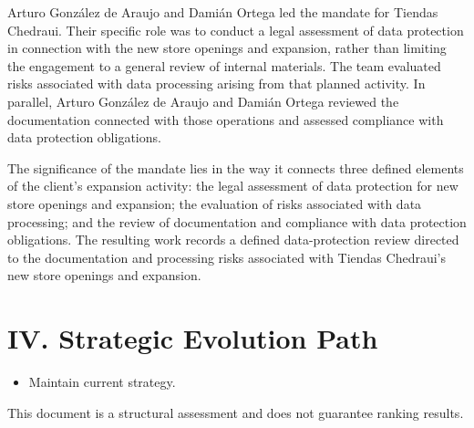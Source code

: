 \documentclass[11pt]{article}
\begin{document}
\begin{itemize}
Arturo González de Araujo and Damián Ortega led the mandate for Tiendas Chedraui. Their specific role was to conduct a legal assessment of data protection in connection with the new store openings and expansion, rather than limiting the engagement to a general review of internal materials. The team evaluated risks associated with data processing arising from that planned activity. In parallel, Arturo González de Araujo and Damián Ortega reviewed the documentation connected with those operations and assessed compliance with data protection obligations.

The significance of the mandate lies in the way it connects three defined elements of the client’s expansion activity: the legal assessment of data protection for new store openings and expansion; the evaluation of risks associated with data processing; and the review of documentation and compliance with data protection obligations. The resulting work records a defined data-protection review directed to the documentation and processing risks associated with Tiendas Chedraui’s new store openings and expansion.

\end{itemize}

\section*{IV. Strategic Evolution Path}
\begin{itemize}
\item Maintain current strategy.
\end{itemize}

\vfill
\centering
\small{This document is a structural assessment and does not guarantee ranking results.}
\end{document}
